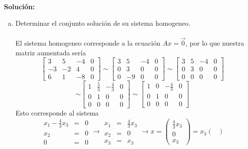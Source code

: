 \documentclass[12pt]{article}
\newenvironment{solucion}
{\begin{mdframed}[backgroundcolor=black!10]
		{\bf Solución:}\\
	}
	{
	\end{mdframed}
}
\newenvironment{preguntas}
{\begin{enumerate}\itemsep12pt
	}
	{
	\end{enumerate}
}
\newcommand{\ra}{\rightarrow}
\begin{document}
\begin{preguntas}
\begin{solucion}
\begin{enumerate}[a)]
\item Determinar el conjunto solución de su sistema homogeneo.\\\\
			El sistema homogeneo corresponde a la ecuación $Ax=\vec{0}$, por lo que nuestra matriz aumentada sería
			$$\left[
			\begin{array}{ccc|c}
			3 & 5 & -4 & 0\\
			-3 & -2 & 4 & 0\\
			6 & 1 & -8 & 0
			\end{array}
			\right] \sim \left[
			\begin{array}{ccc|c}
			3 & 5 & -4 & 0\\
			0 & 3 & 0 & 0\\
			0 & -9 & 0 & 0
			\end{array}
			\right] \sim \left[
			\begin{array}{ccc|c}
			3 & 5 & -4 & 0\\
			0 & 3 & 0 & 0\\
			0 & 0 & 0 & 0
			\end{array}
			\right]$$
			$$\sim \left[
			\begin{array}{ccc|c}
			1 & \frac{5}{3} & -\frac{4}{3} & 0\\
			0 & 1 & 0 & 0\\
			0 & 0 & 0 & 0
			\end{array}
			\right] \sim \left[
			\begin{array}{ccc|c}
			1 & 0 & -\frac{4}{3} & 0\\
			0 & 1 & 0 & 0\\
			0 & 0 & 0 & 0
			\end{array}
			\right]$$
			Esto corresponde al sistema
			$$\begin{array}{rcl}
			x_1 - \frac{4}{3}x_3 & = & 0\\
			x_2 & = & 0\\
			0 & = & 0
			\end{array} \ra \begin{array}{rcl}
			x_1 & = & \frac{4}{3}x_3\\
			x_2 & = & 0\\
			x_3 & = & x_3
			\end{array} \ra x = \begin{pmatrix}
			\frac{4}{3}x_3\\
			0\\
			x_3
			\end{pmatrix} = x_3\begin{pmatrix}

\end{pmatrix}$$
\end{enumerate}
\end{solucion}
\end{preguntas}
\end{document}

